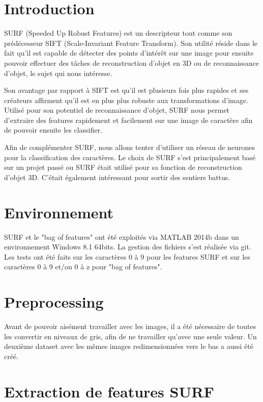 
\section{Introduction}

SURF (Speeded Up Robust Features) est un descripteur tout comme son prédécesseur SIFT (Scale-Invariant Feature Transform). Son utilité réside dans le fait qu'il est capable de détecter des points d'intérêt sur une image pour ensuite pouvoir effectuer des tâches de reconstruction d'objet en 3D ou de reconnaissance d'objet, le sujet qui nous intéresse.

Son avantage par rapport à SIFT est qu'il est plusieurs fois plus rapides et ses créateurs affirment qu'il est en plus plus robuste aux transformations d'image. Utilisé pour son potentiel de reconnaissance d'objet, SURF nous permet d'extraire des features rapidement et facilement sur une image de caractère afin de pouvoir ensuite les classifier.

Afin de complémenter SURF, nous allons tenter d'utiliser un réseau de neurones pour la classification des caractères. Le choix de SURF s'est principalement basé sur un projet passé ou SURF était utilisé pour sa fonction de reconstruction d'objet 3D. C'était également intéressant pour sortir des sentiers battus.

\section{Environnement}

SURF et le "bag of features" ont été exploités via MATLAB 2014b dans un environnement Windows 8.1 64bits. La gestion des fichiers s'est réalisée via git. Les tests ont été faits sur les caractères 0 à 9 pour les features SURF et sur les caractères 0 à 9 et/ou 0 à z pour "bag of features".

\section{Preprocessing}

Avant de pouvoir aisément travailler avec les images, il a été nécessaire de toutes les convertir en niveaux de gris, afin de ne travailler qu'avec une seule valeur. Un deuxième dataset avec les mêmes images redimensionnées vers le bas a aussi été créé.

\section{Extraction de features SURF}

